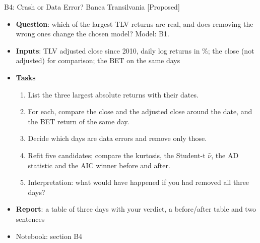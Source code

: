\begin{frame}{B4: Crash or Data Error? Banca Transilvania [Proposed]}
\itemsize{\scriptsize}
\begin{itemize}
\item \textbf{Question}: which of the largest TLV returns are real, and does removing the wrong ones change the chosen model? Model: B1.
\item \textbf{Inputs}: TLV adjusted close since 2010, daily log returns in \%; the close (not adjusted) for comparison; the BET on the same days
\item \textbf{Tasks}
\begin{enumerate}
    \item List the three largest absolute returns with their dates.
    \item For each, compare the close and the adjusted close around the date, and the BET return of the same day.
    \item Decide which days are data errors and remove only those.
    \item Refit five candidates; compare the kurtosis, the Student-t $\hat\nu$, the AD statistic and the AIC winner before and after.
    \item Interpretation: what would have happened if you had removed all three days?
\end{enumerate}
\item \textbf{Report}: a table of three days with your verdict, a before/after table and two sentences
\item Notebook: section B4
\end{itemize}
\end{frame}

